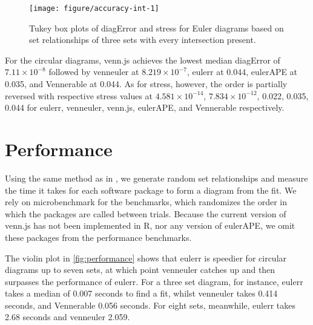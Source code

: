 \documentclass[
  oneside,
  openany,
  numbers=noendperiod,
  parskip=half,
  bibliography=totoc
]{scrbook}\usepackage[]{graphicx}\usepackage{xcolor}
\newenvironment{knitrout}{}{} %
\newcommand{\pkg}[1]{{\fontseries{b}\selectfont #1}}
\begin{document}
\begin{figure}[hbtp]
\caption{Tukey box plots of diagError and stress for Euler diagrams
based on set relationships of three sets with every
intersection present.\label{fig:accuracy-int}}
\begin{knitrout}\small
{}\color{fgcolor}

{\centering \texttt{[image: figure/accuracy-int-1]} 

}



\end{knitrout}
\end{figure}

For the circular diagrams, \pkg{venn.js} achieves the lowest median diagError of
\ensuremath{7.11\times 10^{-8}} followed by \pkg{venneuler} at \ensuremath{8.219\times 10^{-7}},
\pkg{eulerr} at 0.044, \pkg{eulerAPE} at 0.035,
and \pkg{Vennerable} at 0.044. As for stress, however, the order is
partially reversed with respective stress values at
\ensuremath{4.581\times 10^{-14}}, \ensuremath{7.834\times 10^{-12}}, 0.022, 0.035,
0.044 for
\pkg{eulerr}, \pkg{venneuler}, \pkg{venn.js}, \pkg{eulerAPE}, and \pkg{Vennerable}
respectively.

\section{Performance}
\label{sec:performance}

Using the same method as in , we generate random set
relationships and measure the time it takes for each software package to form a
diagram from the fit. We rely on \pkg{microbenchmark} for the benchmarks,
which randomizes the order in which the packages are called between trials.
Because the current version of \pkg{venn.js} has not been implemented in R, nor
any version of \pkg{eulerAPE}, we omit these packages from the
performance benchmarks.



The violin plot in \cref{fig:performance} shows that \pkg{eulerr} is speedier
for circular diagrams up to seven sets, at which point \pkg{venneuler} catches
up and then surpasses the performance of \pkg{eulerr}. For a three set diagram,
for instance, \pkg{eulerr} takes a median of
0.007
seconds to find a fit, whilst \pkg{venneuler} takes 0.414
seconds, and \pkg{Vennerable} 0.056
seconds. For eight sets, meanwhile, \pkg{eulerr} takes
2.68
seconds and \pkg{venneuler} 2.059.
\end{document}
